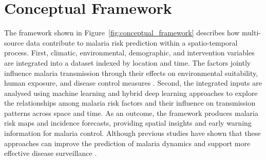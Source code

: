 \section{Conceptual Framework}
The  framework shown in Figure~\ref{fig:conceptual_framework} describes how multi-source data contribute to malaria risk prediction within a spatio-temporal process. First, climatic, environmental, demographic, and intervention variables are integrated into a dataset indexed by location and time. The factors jointly influence malaria transmission through their effects on environmental suitability, human exposure, and disease control measures \cite{Caminade2023}. Second, the integrated inputs are analysed using machine learning and hybrid deep learning approaches to explore the relationships among malaria risk factors and their influence on transmission patterns across space and time. As an outcome, the framework produces malaria risk maps and incidence forecasts, providing spatial insights and early warning information for malaria control. Although previous studies have shown that these approaches can improve the prediction of malaria dynamics and support more effective disease surveillance \cite{Egbuna2025}. 
